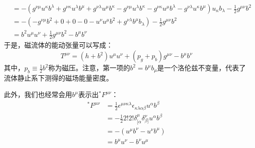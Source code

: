 \documentclass[lang=cn,color=blue,cm,11pt,scheme=chinese,bibend=bibtex,sorting=nty]{elegantbook}
\begin{document}
\begin{note}
\begin{align*}
			& = - (g^{\nu \mu} u^{\kappa} b^{\lambda} + g^{\nu \kappa} u^{\lambda} b^{\mu} + g^{\nu \lambda} u^{\mu} b^{\kappa} - g^{\nu \mu} u^{\lambda} b^{\kappa} - g^{\nu \kappa} u^{\mu} b^{\lambda} - g^{\nu \lambda} u^{\kappa} b^{\mu}) u_{\kappa} b_{\lambda} - \frac{1}{2} g^{\mu \nu} b^2\\
			& = - (- g^{\nu \mu} b^2 + 0 + 0 - 0 - u^{\nu} u^{\mu} b^2 + g^{\nu \lambda} b^{\mu} b_{\lambda}) - \frac{1}{2} g^{\mu \nu} b^2\\
			& = b^2 u^{\mu} u^{\nu} + \frac{1}{2} g^{\mu \nu} b^2 - b^{\mu} b^{\nu}
		\end{align*}
		于是，磁流体的能动张量可以写成：
		\begin{equation}
			T^{\mu \nu} = (h + b^2) u^{\mu} u^{\nu} + (p_g + p_b) g^{\mu \nu} - b^{\mu} b^{\nu}
		\end{equation}
		其中，$p_b \equiv \frac{1}{2} b^2$称为磁压。注意，第一项的$b^2 = b^{\mu} b_{\mu}$是一个洛伦兹不变量，代表了流体静止系下测得的磁场能量密度。
		
		此外，我们也经常会用$b^{\mu}$表示出${}^{*}F^{\mu \nu}$：
		\begin{align*}
			{}^{*}F^{\mu \nu} & = \frac{1}{2} \epsilon^{\mu \nu \kappa \lambda} \epsilon_{\kappa \lambda \alpha \beta} u^{\alpha} b^{\beta}\\
			& = - \frac{1}{2} 2! 2! \delta^{\mu}_{[\alpha} \delta^{\nu}_{\beta]} u^{\alpha} b^{\beta}\\
			& = - (u^{\mu} b^{\nu} - u^{\nu} b^{\mu})\\
			& = b^{\mu} u^{\nu} - b^{\nu} u^{\mu}
		\end{align*}
	\end{note}
	
\end{document}
